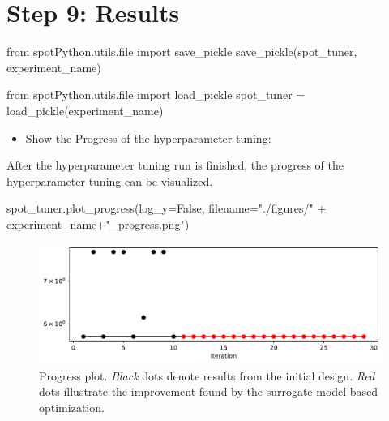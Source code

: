 \documentclass[
  letterpaper,
  DIV=11,
  numbers=noendperiod]{scrreprt}
\newenvironment{Shaded}{\begin{snugshade}}{\end{snugshade}}
\newcommand{\BuiltInTok}[1]{\textcolor[rgb]{0.00,0.23,0.31}{#1}}
\newcommand{\ImportTok}[1]{\textcolor[rgb]{0.00,0.46,0.62}{#1}}
\newcommand{\NormalTok}[1]{\textcolor[rgb]{0.00,0.23,0.31}{#1}}
\newcommand{\OperatorTok}[1]{\textcolor[rgb]{0.37,0.37,0.37}{#1}}
\newcommand{\StringTok}[1]{\textcolor[rgb]{0.13,0.47,0.30}{#1}}
\newcommand{\VariableTok}[1]{\textcolor[rgb]{0.07,0.07,0.07}{#1}}
\providecommand{\tightlist}{%
  \setlength{\itemsep}{0pt}\setlength{\parskip}{0pt}}\usepackage{longtable,booktabs,array}
\begin{document}
\hypertarget{sec-results-tuning-10}{%
\section{Step 9: Results}\label{sec-results-tuning-10}}

\begin{Shaded}
\begin{Highlighting}[]
\ImportTok{from}\NormalTok{ spotPython.utils.}\BuiltInTok{file} \ImportTok{import}\NormalTok{ save\_pickle}
\NormalTok{save\_pickle(spot\_tuner, experiment\_name)}
\end{Highlighting}
\end{Shaded}

\begin{Shaded}
\begin{Highlighting}[]
\ImportTok{from}\NormalTok{ spotPython.utils.}\BuiltInTok{file} \ImportTok{import}\NormalTok{ load\_pickle}
\NormalTok{spot\_tuner }\OperatorTok{=}\NormalTok{ load\_pickle(experiment\_name)}
\end{Highlighting}
\end{Shaded}

\begin{itemize}
\tightlist
\item
  Show the Progress of the hyperparameter tuning:
\end{itemize}

After the hyperparameter tuning run is finished, the progress of the
hyperparameter tuning can be visualized.

\begin{Shaded}
\begin{Highlighting}[]
\NormalTok{spot\_tuner.plot\_progress(log\_y}\OperatorTok{=}\VariableTok{False}\NormalTok{,}
\NormalTok{    filename}\OperatorTok{=}\StringTok{"./figures/"} \OperatorTok{+}\NormalTok{ experiment\_name}\OperatorTok{+}\StringTok{"\_progress.png"}\NormalTok{)}
\end{Highlighting}
\end{Shaded}

\begin{figure}[H]

{\centering \includegraphics{017_spot_hpt_sklearn_classification_files/figure-pdf/cell-22-output-1.pdf}

}

\caption{Progress plot. \emph{Black} dots denote results from the
initial design. \emph{Red} dots illustrate the improvement found by the
surrogate model based optimization.}

\end{figure}
\end{document}
